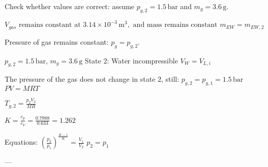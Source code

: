 Check whether values are correct: assume \( p_{g,2} = 1.5 \, \text{bar} \) and \( m_g = 3.6 \, \text{g} \).  

\[ V_{gas} \text{ remains constant at } 3.14 \times 10^{-3} \, \text{m}^3, \text{ and mass remains constant } m_{EW} = m_{EW,2} \]  

Pressure of gas remains constant: \( p_{g} = p_{g,2} \).

\( p_{g,2} = 1.5 \, \text{bar}, \, m_g = 3.6 \, \text{g} \)  
State 2: Water incompressible  
\( V_{W} = V_{L,i} \)  

The pressure of the gas does not change in state 2, still:  
\( p_{g,2} = p_{g,1} = 1.5 \, \text{bar} \)  
\( PV = MRT \)  

\( T_{g,2} = \frac{p_{2}V_{2}}{MR} \)  

\( K = \frac{c_p}{c_V} = \frac{0.7988}{0.633} = 1.262 \)  

Equations:  
\( \left( \frac{p_2}{p_1} \right)^{\frac{K-1}{K}} = \frac{V_1}{V_2} \)  
\( p_2 = p_1 \)  

---
